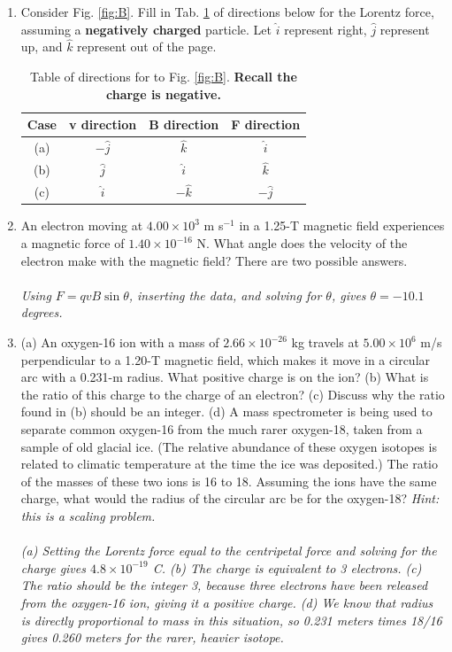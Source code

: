 \documentclass[12pt,twocolumn]{article}
\begin{document}
\noindent
\begin{enumerate}
\item Consider Fig. \ref{fig:B}. Fill in Tab. \ref{tab:ex} of directions below for the Lorentz force, assuming a \textbf{negatively charged} particle.  Let $\hat{i}$ represent right, $\hat{j}$ represent up, and $\hat{k}$ represent out of the page.
\begin{table}
\centering
\begin{tabular}{| c | c | c | c |}
\hline
Case & v direction & B direction & F direction \\ \hline
(a) & $-\hat{j}$ & $\hat{k}$ & $\hat{i}$ \\ \hline
(b) & $\hat{j}$ & $\hat{i}$ & $\hat{k}$ \\ \hline
(c) & $\hat{i}$ & $-\hat{k}$ & $-\hat{j}$ \\ \hline
\end{tabular}
\caption{\label{tab:ex} Table of directions for to Fig. \ref{fig:B}. \textbf{Recall the charge is negative.}}
\end{table}
\item An electron moving at $4.00\times 10^3$ m s$^{-1}$ in a 1.25-T magnetic field experiences a magnetic force of $1.40\times 10^{-16}$ N. What angle does the velocity of the electron make with the magnetic field? There are two possible answers. \\ \\
\textit{Using $F = qvB\sin\theta$, inserting the data, and solving for $\theta$, gives $\theta = -10.1$ degrees.}
\item (a) An oxygen-16 ion with a mass of $2.66\times 10^{-26}$ kg travels at $5.00\times 10^6$ m/s perpendicular to a 1.20-T magnetic field, which makes it move in a circular arc with a 0.231-m radius. What positive charge is on the ion? (b) What is the ratio of this charge to the charge of an electron? (c) Discuss why the ratio found in (b) should be an integer. (d) A mass spectrometer is being used to separate common oxygen-16 from the much rarer oxygen-18, taken from a sample of old glacial ice. (The relative abundance of these oxygen isotopes is related to climatic temperature at the time the ice was deposited.) The ratio of the masses of these two ions is 16 to 18.  Assuming the ions have the same charge, what would the radius of the circular arc be for the oxygen-18?  \textit{Hint: this is a scaling problem.} \\ \\
\textit{(a) Setting the Lorentz force equal to the centripetal force and solving for the charge gives $4.8 \times 10^{-19}$ C. (b) The charge is equivalent to 3 electrons. (c) The ratio should be the integer 3, because three electrons have been released from the oxygen-16 ion, giving it a positive charge. (d) We know that radius is directly proportional to mass in this situation, so 0.231 meters times 18/16 gives 0.260 meters for the rarer, heavier isotope.}

\end{enumerate}
\end{document}
